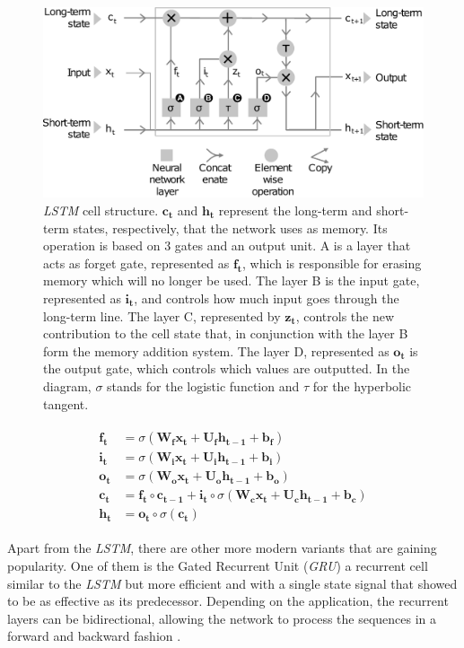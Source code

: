 \begin{figure}
	\centering
	\includegraphics[width=0.7\linewidth]{chapter2/images/LSTM}
	\caption{\textit{LSTM} cell structure. $\mathbf{c_t}$ and $\mathbf{h_t}$ represent the long-term and short-term states, respectively, that the network uses as memory. Its operation is based on 3 gates and an output unit. A is a layer that acts as forget gate, represented as $\mathbf{f_t}$, which is responsible for erasing memory which will no longer be used. The layer B is the input gate, represented as $\mathbf{i_t}$, and controls how much input goes through the long-term line. The layer C, represented by $\mathbf{z_t}$, controls the new contribution to the cell state that, in conjunction with the layer B form the memory addition system. The layer D, represented as $\mathbf{o_t}$ is the output gate, which controls which values are outputted. In the diagram, $\sigma$ stands for the logistic function and $\tau$ for the hyperbolic tangent.}
	\label{fig:lstm}
\end{figure}



\begin{align}
\label{eq:LSTM}
\begin{split}
	\mathbf{f_t} &= \sigma(\mathbf{W_f} \mathbf{x_t} + \mathbf{U_f} \mathbf{h_{t-1}} + \mathbf{b_f})\\
	\mathbf{i_t} &= \sigma(\mathbf{W_i} \mathbf{x_t} + \mathbf{U_i} \mathbf{h_{t-1}} + \mathbf{b_i})\\
	\mathbf{o_t} &= \sigma(\mathbf{W_o} \mathbf{x_t} + \mathbf{U_o} \mathbf{h_{t-1}} + \mathbf{b_o})\\
	\mathbf{c_t} &= \mathbf{f_t} \circ \mathbf{c_{t-1}} + \mathbf{i_t} \circ \sigma(\mathbf{W_c} \mathbf{x_t} + \mathbf{U_c} \mathbf{h_{t-1}} + \mathbf{b_c})\\
	\mathbf{h_t} &= \mathbf{o_t} \circ \sigma(\mathbf{c_t})
\end{split}
\end{align}

Apart from the \textit{LSTM}, there are other more modern variants that are gaining popularity. One of them is the Gated Recurrent Unit (\textit{GRU}) \cite{chung2014} a recurrent cell similar to the \textit{LSTM} but more efficient and with a single state signal that showed to be as effective as its predecessor. Depending on the application, the recurrent layers can be bidirectional, allowing the network to process the sequences in a forward and backward fashion \cite{schuster1997}. 


